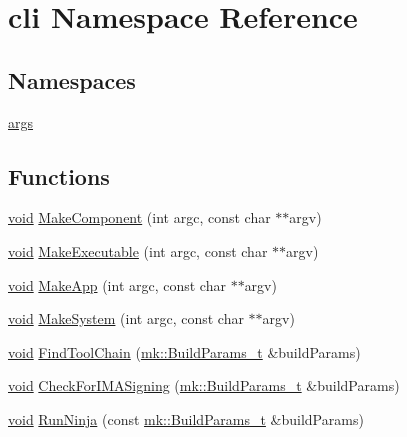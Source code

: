 \hypertarget{namespacecli}{}\section{cli Namespace Reference}
\label{namespacecli}
\subsection*{Namespaces}
\begin{DoxyCompactItemize}
\item 
 \hyperlink{namespacecli_1_1args}{args}
\end{DoxyCompactItemize}
\subsection*{Functions}
\begin{DoxyCompactItemize}
\item 
\hyperlink{_t_e_m_p_l_a_t_e__cdef_8h_ac9c84fa68bbad002983e35ce3663c686}{void} \hyperlink{namespacecli_ae39d1bd7140d97c0b0a0731b861ac0d3}{Make\+Component} (int argc, const char $\ast$$\ast$argv)
\item 
\hyperlink{_t_e_m_p_l_a_t_e__cdef_8h_ac9c84fa68bbad002983e35ce3663c686}{void} \hyperlink{namespacecli_a5656a52c5530af0dda2cfedc976d2a1a}{Make\+Executable} (int argc, const char $\ast$$\ast$argv)
\item 
\hyperlink{_t_e_m_p_l_a_t_e__cdef_8h_ac9c84fa68bbad002983e35ce3663c686}{void} \hyperlink{namespacecli_a3bb51aed731d4b08a779f4587fc1c3c8}{Make\+App} (int argc, const char $\ast$$\ast$argv)
\item 
\hyperlink{_t_e_m_p_l_a_t_e__cdef_8h_ac9c84fa68bbad002983e35ce3663c686}{void} \hyperlink{namespacecli_abd8710ecbbe89cad6c38798334032cbc}{Make\+System} (int argc, const char $\ast$$\ast$argv)
\item 
\hyperlink{_t_e_m_p_l_a_t_e__cdef_8h_ac9c84fa68bbad002983e35ce3663c686}{void} \hyperlink{namespacecli_a90c57f7848ca2ef6e8826f10025dcc2c}{Find\+Tool\+Chain} (\hyperlink{structmk_1_1_build_params__t}{mk\+::\+Build\+Params\+\_\+t} \&build\+Params)
\item 
\hyperlink{_t_e_m_p_l_a_t_e__cdef_8h_ac9c84fa68bbad002983e35ce3663c686}{void} \hyperlink{namespacecli_ac251f0a6a352398608010c556f14b05c}{Check\+For\+I\+M\+A\+Signing} (\hyperlink{structmk_1_1_build_params__t}{mk\+::\+Build\+Params\+\_\+t} \&build\+Params)
\item 
\hyperlink{_t_e_m_p_l_a_t_e__cdef_8h_ac9c84fa68bbad002983e35ce3663c686}{void} \hyperlink{namespacecli_a92491517b4c7c45c4776d89eb2ece466}{Run\+Ninja} (const \hyperlink{structmk_1_1_build_params__t}{mk\+::\+Build\+Params\+\_\+t} \&build\+Params)

\end{DoxyCompactItemize}
